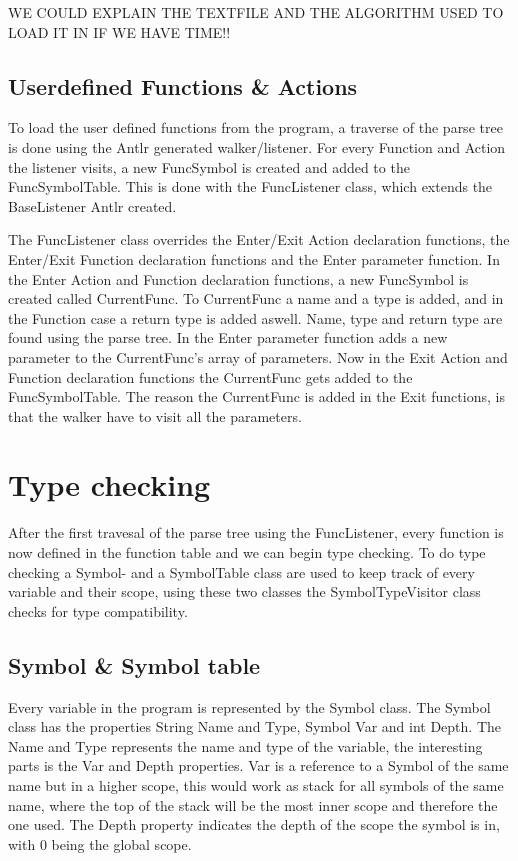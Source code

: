 WE COULD EXPLAIN THE TEXTFILE AND THE ALGORITHM USED TO LOAD IT IN IF WE HAVE TIME!!

\subsection{Userdefined Functions \& Actions}
To load the user defined functions from the program, a traverse of the parse tree is done using the Antlr generated walker/listener. For every Function and Action the listener visits, a new FuncSymbol is created and added to the FuncSymbolTable. This is done with the FuncListener class, which extends the BaseListener Antlr created.
 
The FuncListener class overrides the Enter/Exit Action declaration functions, the Enter/Exit Function declaration functions and the Enter parameter function. In the Enter Action and Function declaration functions, a new FuncSymbol is created called CurrentFunc. To CurrentFunc a name and a type is added, and in the Function case a return type is added aswell. Name, type and return type are found using the parse tree.
In the Enter parameter function adds a new parameter to the CurrentFunc's array of parameters. 
Now in the Exit Action and Function declaration functions the CurrentFunc gets added to the FuncSymbolTable. 
The reason the CurrentFunc is added in the Exit functions, is that the walker have to visit all the parameters. 

\section{Type checking} 
After the first travesal of the parse tree using the FuncListener, every function is now defined in the function table and we can begin type checking. To do type checking a Symbol- and a SymbolTable class are used to keep track of every variable and their scope, using these two classes the SymbolTypeVisitor class checks for type compatibility. 

\subsection{Symbol \& Symbol table}
Every variable in the program is represented by the Symbol class. The Symbol class has the properties String Name and Type, Symbol Var and int Depth. The Name and Type represents the name and type of the variable, the interesting parts is the Var and Depth properties. Var is a reference to a Symbol of the same name but in a higher scope, this would work as stack for all symbols of the same name, where the top of the stack will be the most inner scope and therefore the one used. The Depth property indicates the depth of the scope the symbol is in, with 0 being the global scope. 

